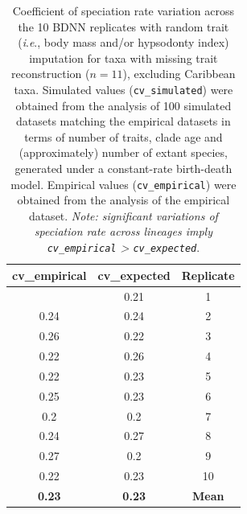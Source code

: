 \documentclass[
  9pt,
  letterpaper,
]{article}
\begin{document}
\begin{longtable}[]{@{}ccc@{}}

\caption{\label{tbl-cv_sp}Coefficient of speciation rate variation
across the 10 BDNN replicates with random trait (\emph{i}.\emph{e}.,
body mass and/or hypsodonty index) imputation for taxa with missing
trait reconstruction (\(n=11\)), excluding Caribbean taxa. Simulated
values (\texttt{cv\_simulated}) were obtained from the analysis of 100
simulated datasets matching the empirical datasets in terms of number of
traits, clade age and (approximately) number of extant species,
generated under a constant-rate birth-death model. Empirical values
(\texttt{cv\_empirical}) were obtained from the analysis of the
empirical dataset. \emph{Note: significant variations of speciation rate
across lineages imply \texttt{cv\_empirical} \textgreater{}
\texttt{cv\_expected}}.}

\tabularnewline

\toprule\noalign{}
cv\_empirical & cv\_expected & Replicate \\
\midrule\noalign{}
\endhead
\bottomrule\noalign{}
\endlastfoot
0.22 & 0.21 & 1 \\
0.24 & 0.24 & 2 \\
0.26 & 0.22 & 3 \\
0.22 & 0.26 & 4 \\
0.22 & 0.23 & 5 \\
0.25 & 0.23 & 6 \\
0.2 & 0.2 & 7 \\
0.24 & 0.27 & 8 \\
0.27 & 0.2 & 9 \\
0.22 & 0.23 & 10 \\
\textbf{0.23} & \textbf{0.23} & \textbf{Mean} \\

\end{longtable}

\hfill\break
\end{document}
